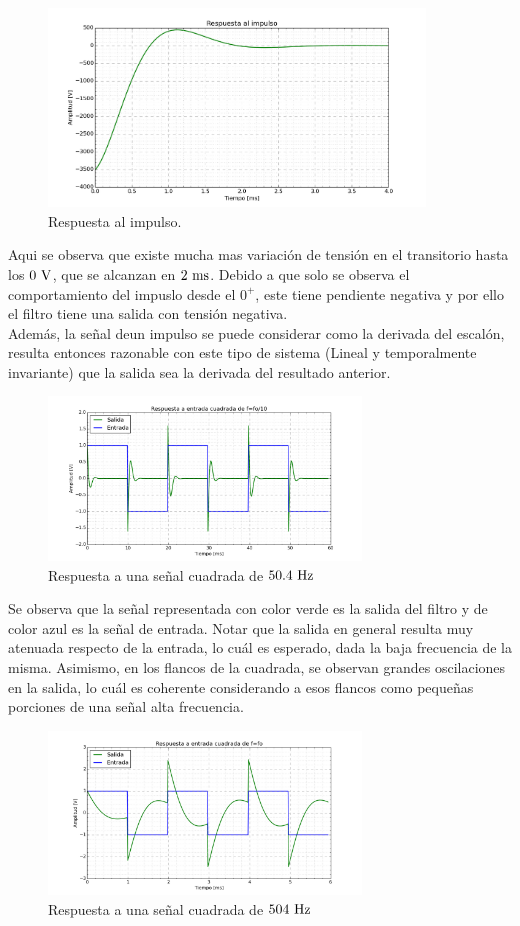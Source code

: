 \begin{figure}[hbt]
	\centering
	\includegraphics[width=10cm]{imagenes/Impulse}	\caption{Respuesta al impulso.}
\end{figure}
Aqui se observa que existe mucha mas variaci\'on de tensi\'on en el transitorio hasta los $0\ \si{\volt}$, que se alcanzan en $2 \ \si{\milli\second}$. Debido a que solo se observa el comportamiento del impuslo desde el $0^+$, este tiene pendiente negativa y por ello el filtro tiene una salida con tensi\'on negativa. \\
Adem\'as, la señal deun impulso se puede considerar como la derivada del escal\'on, resulta entonces razonable con este tipo de sistema (Lineal y temporalmente invariante) que la salida sea la derivada del resultado anterior.

\begin{figure}[H]
	\centering
	\includegraphics[width=8.3cm]{imagenes/Cuadrada_f:10}	\caption{Respuesta a una señal cuadrada de $50.4\ \si{\hertz}$}	
\end{figure}

Se observa que la señal representada con color verde es la salida  del filtro y de color azul es la señal de entrada. Notar que la salida en general resulta muy atenuada respecto de la entrada,  lo cu\'al es esperado, dada la baja frecuencia de la misma. Asimismo, en los flancos de la cuadrada, se observan grandes oscilaciones en la salida, lo cu\'al es coherente considerando a esos flancos como pequeñas porciones de una señal alta frecuencia.\\

\begin{figure}[hbt]
	\centering
	\includegraphics[width=8.3cm]{imagenes/Cuadrada_f}	\caption{Respuesta a una señal cuadrada de $504\ \si{\hertz}$}	
\end{figure}

